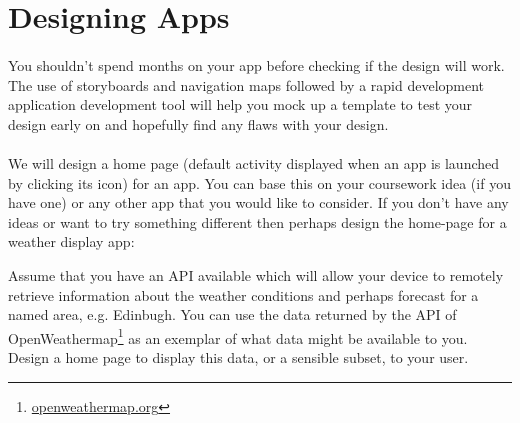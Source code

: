 
\section{Designing Apps}
\paragraph{} You shouldn’t spend months on your app before checking if the design will work. The use of storyboards and navigation maps followed by a rapid development application development tool will help you mock up a template to test your design early on and hopefully find any flaws with your design.

\paragraph{} We will design a home page (default activity displayed when an app is launched by clicking its icon) for an app. You can base this on your coursework idea (if you have one) or any other app that you would like to consider. If you don't have any ideas or want to try something different then perhaps design the home-page for a weather display app:

\begin{framed}
Assume that you have an API available which will allow your device to remotely retrieve information about the weather conditions and perhaps forecast for a named area, e.g. Edinbugh. You can use the data returned by the API of OpenWeathermap\footnote{\url{openweathermap.org}} as an exemplar of what data might be available to you. Design a home page to display this data, or a sensible subset, to your user.
\end{framed}

